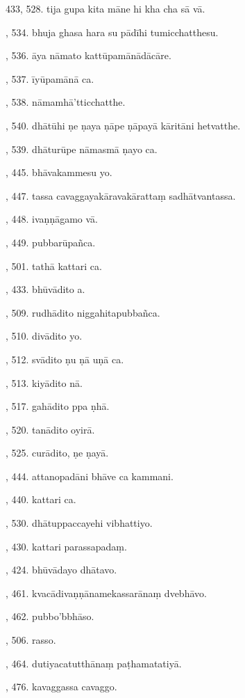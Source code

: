 433, 528. tija gupa kita māne hi kha cha sā vā.\par {}, 534. bhuja ghasa hara su pādīhi tumicchatthesu.\par {}, 536. āya nāmato kattūpamānādācāre.\par {}, 537. īyūpamānā ca.\par {}, 538. nāmamhā’tticchatthe.\par {}, 540. dhātūhi ṇe ṇaya ṇāpe ṇāpayā kāritāni hetvatthe.\par {}, 539. dhāturūpe nāmasmā ṇayo ca.\par {}, 445. bhāvakammesu yo.\par {}, 447. tassa cavaggayakāravakārattaṃ sadhātvantassa.\par {}, 448. ivaṇṇāgamo vā.\par {}, 449. pubbarūpañca.\par {}, 501. tathā kattari ca.\par {}, 433. bhūvādito a.\par {}, 509. rudhādito niggahitapubbañca.\par {}, 510. divādito yo.\par {}, 512. svādito ṇu ṇā uṇā ca.\par {}, 513. kiyādito nā.\par {}, 517. gahādito ppa ṇhā.\par {}, 520. tanādito oyirā.\par {}, 525. curādito, ṇe ṇayā.\par {}, 444. attanopadāni bhāve ca kammani.\par {}, 440. kattari ca.\par {}, 530. dhātuppaccayehi vibhattiyo.\par {}, 430. kattari parassapadaṃ.\par {}, 424. bhūvādayo dhātavo.\par {}, 461. kvacādivaṇṇānamekassarānaṃ dvebhāvo.\par {}, 462. pubbo’bbhāso.\par {}, 506. rasso.\par {}, 464. dutiyacatutthānaṃ paṭhamatatiyā.\par {}, 476. kavaggassa cavaggo.\par \noindent
